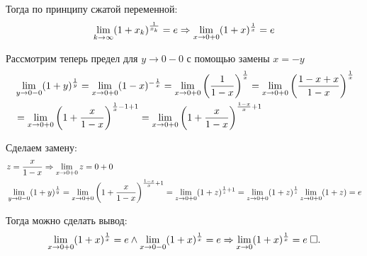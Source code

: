 \documentclass{article}
\begin{document}
Тогда по принципу сжатой переменной:
\begin{align*}
	\lim\limits_{k\to\infty}(1+x_{k})^{\frac{1}{x_{k}}}=e\Rightarrow \lim\limits_{x\to 0+0}(1+x)^{\frac{1}{x}}=e
\end{align*}

\pagebreak

Рассмотрим теперь предел для $y\to 0-0$ с помощью замены $x=-y$
\begin{align*}
	 & \lim\limits_{y\to 0-0}(1+y)^{\frac{1}{y}}=\lim\limits_{x\to 0+0}(1-x)^{-\frac{1}{x}}=
	\lim\limits_{x\to 0+0}\left(\frac{1}{1-x}\right)^{\frac{1}{x}}=\lim\limits_{x\to 0+0}\left(\frac{1-x+x}{1-x}\right)^{\frac{1}{x}}             \\
	 & =\lim\limits_{x\to 0+0}\left(1+\frac{x}{1-x}\right)^{\frac{1}{x}-1+1}=\lim\limits_{x\to 0+0}\left(1+\frac{x}{1-x}\right)^{\frac{1-x}{x}+1} \\
\end{align*}

Сделаем замену:
\begin{align*}
	 & z=\frac{x}{1-x}\Rightarrow\lim\limits_{x\to 0+0}z=0+0                                                         \\
	 & \lim\limits_{y\to 0-0}(1+y)^{\frac{1}{y}}=\lim\limits_{x\to 0+0}\left(1+\frac{x}{1-x}\right)^{\frac{1-x}{x}+1}
	=\lim\limits_{z\to 0+0}(1+z)^{\frac{1}{z}+1}=\lim\limits_{z\to 0+0}(1+z)^{\frac{1}{z}}\lim\limits_{z\to 0+0}(1+z)=e
\end{align*}

Тогда можно сделать вывод:
\begin{align*}
	\lim\limits_{x\to 0+0}(1+x)^{\frac{1}{x}}=e\land\lim\limits_{x\to 0-0}(1+x)^{\frac{1}{x}}=e\Rightarrow\lim\limits_{x\to 0}(1+x)^{\frac{1}{x}}=e\;\square.
\end{align*}
\end{document}
